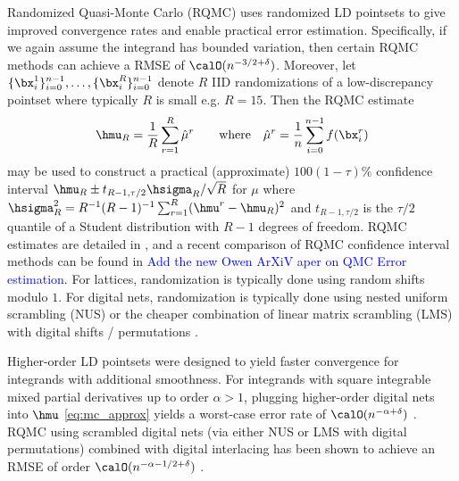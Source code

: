 \documentclass[acmsmall]{acmart}
\newcommand{\FJHNote}[1]{\textcolor{blue}{#1}}
\begin{document}
Randomized Quasi-Monte Carlo (RQMC) uses randomized LD pointsets to give improved convergence rates and enable practical error estimation. Specifically, if we again assume the integrand has bounded variation, then certain RQMC methods can achieve a RMSE of $\calO(n^{-3/2+\delta})$. Moreover, let $\{\bx_i^1\}_{i=0}^{n-1}, \dots, \{\bx_i^R\}_{i=0}^{n-1}$ denote $R$ IID randomizations of a low-discrepancy pointset where typically $R$ is small e.g. $R=15$. Then the RQMC estimate 
\begin{equation}
    \hmu_R = \frac{1}{R} \sum_{r=1}^R \hat{\mu}^r \qquad \text{where} \quad \hat{\mu}^r = \frac{1}{n} \sum_{i=0}^{n-1} f(\bx_i^r)
    \label{eq:RQMC}
\end{equation}
may be used to construct a practical (approximate) $100(1-\tau)\%$ confidence interval $\hmu_R \pm t_{R-1,\tau/2} \hsigma_R/\sqrt{R}$ for $\mu$ where $\hsigma_R^2 = R^{-1}(R-1)^{-1} \sum_{r=1}^R (\hmu^r - \hmu_R)^2$ and $t_{R-1,\tau/2}$ is the $\tau/2$ quantile of a Student distribution with $R-1$ degrees of freedom. RQMC estimates are detailed in \citep[Chapter 17]{owen.mc_book}, and a recent comparison of RQMC confidence interval methods can be found in \citep{l2023confidence} \FJHNote{Add the new Owen ArXiV aper on QMC Error estimation}. For lattices, randomization is typically done using random shifts modulo $1$. For digital nets, randomization is typically done using nested uniform scrambling (NUS) or the cheaper combination of linear matrix scrambling (LMS) with digital shifts / permutations \citep{owen.variance_alternative_scrambles_digital_net,owen_halton,owen.gain_coefficients_scrambled_halton}.

Higher-order LD pointsets were designed to yield faster convergence for integrands with additional smoothness. For integrands with square integrable mixed partial derivatives up to order $\alpha>1$, plugging higher-order digital nets into $\hmu$ \eqref{eq:mc_approx} yields a worst-case error rate of $\calO(n^{-\alpha+\delta})$ \citep{dick.walsh_spaces_HO_nets,dick.qmc_HO_convergence_MCQMC2008,dick.decay_walsh_coefficients_smooth_functions}. RQMC using scrambled digital nets (via either NUS or LMS with digital permutations) combined with digital interlacing has been shown to achieve an RMSE of order $\calO(n^{-\alpha-1/2+\delta})$ \citep{dick.higher_order_scrambled_digital_nets}. %
\end{document}
